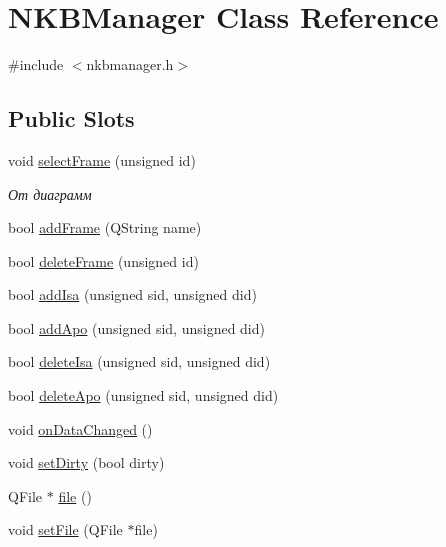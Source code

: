 \hypertarget{class_n_k_b_manager}{
\section{NKBManager Class Reference}
\label{class_n_k_b_manager}
}


{\ttfamily \#include $<$nkbmanager.h$>$}

\subsection*{Public Slots}
\begin{DoxyCompactItemize}
\item 
void \hyperlink{class_n_k_b_manager_a58f8c543c1a974c713294919ba4ed7c9}{selectFrame} (unsigned id)
\begin{DoxyCompactList}\small\item\em От диаграмм \end{DoxyCompactList}\item 
bool \hyperlink{class_n_k_b_manager_a4fa26bf19ef75474042dcf35c860711e}{addFrame} (QString name)
\item 
bool \hyperlink{class_n_k_b_manager_af4eda01f30954df9407eb49aaba59613}{deleteFrame} (unsigned id)
\item 
bool \hyperlink{class_n_k_b_manager_afe81f8704ac3318aafb2e58bb5d6f9d7}{addIsa} (unsigned sid, unsigned did)
\item 
bool \hyperlink{class_n_k_b_manager_a1e3ac00052e6b19a7fb578ab707ac5b8}{addApo} (unsigned sid, unsigned did)
\item 
bool \hyperlink{class_n_k_b_manager_af27ca2ea55de808d474079b1e4283dae}{deleteIsa} (unsigned sid, unsigned did)
\item 
bool \hyperlink{class_n_k_b_manager_a7014324ba3528c7540b69311f3aece3b}{deleteApo} (unsigned sid, unsigned did)
\item 
void \hyperlink{class_n_k_b_manager_ab886e89d91b53e76a4ac37c25e5fbb89}{onDataChanged} ()
\item 
void \hyperlink{class_n_k_b_manager_ad9844119a8ce036e089e908bfd0e695f}{setDirty} (bool dirty)
\item 
QFile $\ast$ \hyperlink{class_n_k_b_manager_aff795d583c83b3f0a146397ef37f4ead}{file} ()
\item 
void \hyperlink{class_n_k_b_manager_ae3e30f6ada9f085ffdd2d80df1a71d9f}{setFile} (QFile $\ast$file)
\end{DoxyCompactItemize}
